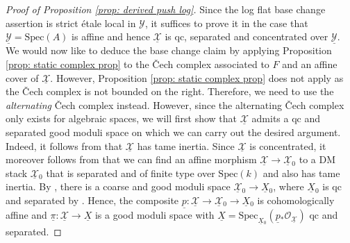 \documentclass[11pt]{amsart}
\theoremstyle{definition}
\theoremstyle{definition}
\newcommand{\cO}{\mathcal{O}}
\newcommand{\cX}{\mathcal{X}}
\newcommand{\ul}[1]{\underline{#1}}
\newcommand{\cal}{\mathcal}
\def\cO{{\cal O}}
\def\cX{{\cal X}}
\begin{document}
\begin{proof}[Proof of Proposition \ref{prop: derived push log}]
    Since the log flat base change assertion is strict \'etale local in $\mathcal{Y}$, it suffices to prove it in the case that $\underline{\mathcal{Y}}= \text{Spec}(A)$ is affine and hence $\underline{\mathcal{X}}$ is qc, separated and concentrated over $\underline{\mathcal{Y}}$. We would now like to deduce the base change claim by applying Proposition \ref{prop: static complex prop} to the \v{C}ech complex associated to $F$ and an affine cover of $\ul{\cX}$. However, Proposition \ref{prop: static complex prop} does not apply as the \v{C}ech complex is not bounded on the right. Therefore, we need to use the \textit{alternating} \v{C}ech complex instead. However, since the alternating \v{C}ech complex only exists for algebraic spaces, we will first show that $\underline{\mathcal{X}}$ admits a qc and separated good moduli space on which we can carry out the desired argument. Indeed, it follows from \cite[Theorem C]{HallRydhWhatStacksAreConcenctrated} that $\underline{\mathcal{X}}$ has tame inertia. Since $\underline{\mathcal{X}}$ is concentrated, it moreover follows from \cite[Theorem D]{rydh2015Noetherian} that we can find an affine morphism $\underline{\mathcal{X}}\rightarrow\underline{\cX}{}_0$ to a DM stack $\underline{\cX}{}_0$ that is separated and of finite type over $\text{Spec}(k)$ and also has tame inertia. By \cite[Theorem 3.2]{TameStacks}, there is a coarse and good moduli space $\underline{\cX}{}_0\rightarrow \underline{X}{}_0$, where $\underline{X}{}_0$ is qc and separated by \cite[Theorem 1.1]{KeelMori}. Hence, the composite $\underline{p}\colon \underline{\cX}\rightarrow \underline{\cX}{}_0\rightarrow \underline{X}{}_0$ is cohomologically affine and $\underline{\pi}\colon \underline{\cX}\rightarrow \underline{X}$ is a good moduli space with $\underline{X}= \text{Spec}_{\underline{X}{}_0}(\underline{p}{}_*\cO_{\underline{\cX}} )$ qc and separated.
    

\end{proof}
\end{document}
